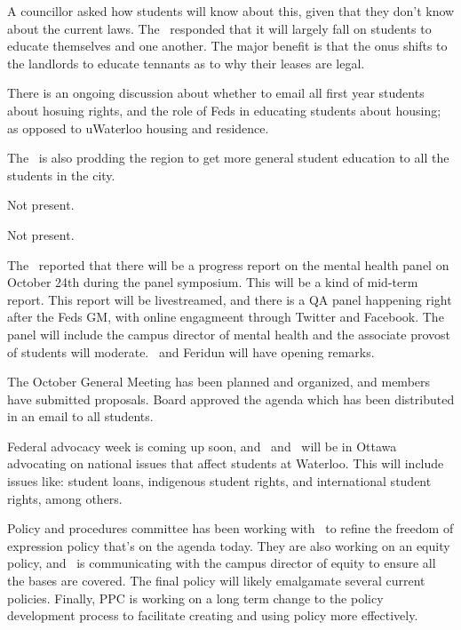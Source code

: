 \begin{information}
    A councillor asked how students will know about this, given that they don't
    know about the current laws. The \vpe\ responded that it will largely fall
    on students to educate themselves and one another. The major benefit is
    that the onus shifts to the landlords to educate tennants as to why their
    leases are legal. 

    There is an ongoing discussion about whether to email all first year
    students about hosuing rights, and the role of Feds in educating students
    about housing; as opposed to uWaterloo housing and residence. 

    The \vped\ is also prodding the region to get more general student 
    education to all the students in the city. 
\end{information}

\begin{information}
    Not present.
\end{information}

\begin{information}
    Not present.
\end{information}

\begin{information}

    The \pres\ reported that there will be a progress report on the mental
    health panel on October 24th during the panel symposium. This will be a
    kind of mid-term report. This report will be livestreamed, and there is
    a QA panel happening right after the Feds GM, with online engagmeent through
    Twitter and Facebook. The panel will include the campus director of mental 
    health and the associate provost of students will moderate. \antonio\ and 
    Feridun will have opening remarks.

    The October General Meeting has been planned and organized, and members 
    have submitted proposals. Board approved the agenda which has been
    distributed in an email to all students.

    Federal advocacy week is coming up soon, and \antonio\ and \andrewc\ will 
    be in Ottawa advocating on national issues that affect students at 
    Waterloo. This will include issues like: student loans, indigenous student
    rights, and international student rights, among others.  

    Policy and procedures committee has been working with \alex\ to refine the
    freedom of expression policy that's on the agenda today. They are also
    working on an equity policy, and \antonio\ is communicating with the campus 
    director of equity to ensure all the bases are covered. The final policy
    will likely emalgamate several current policies.  Finally, PPC is working 
    on a long term change to the policy development process to facilitate
    creating and using policy more effectively.

\end{information}

